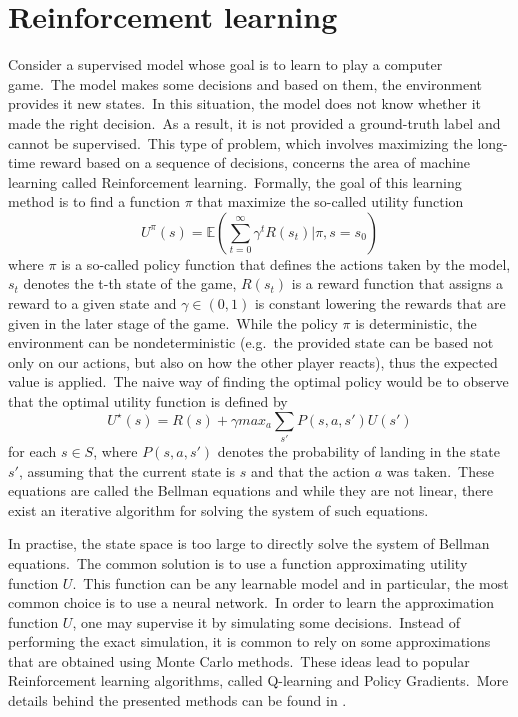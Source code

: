 \documentclass[longabstract, english, mgr]{iithesis}
\theoremstyle{default_theorem_style}\newtheorem{theorem}{Theorem}
\theoremstyle{default_theorem_style}\newtheorem{definition}{Definition}
\begin{document}
\section{Reinforcement learning}\label{sec:reinforcement_learning}

Consider a supervised model whose goal is to learn to play a computer game.\ The model makes some decisions and based
on them, the environment provides it new states.\ In this situation, the model does not know whether it made the
right decision.\ As a result, it is not provided a ground-truth label and cannot be supervised.\ This type of problem,
which involves maximizing the long-time reward based on a sequence of decisions, concerns the area of machine
learning called Reinforcement learning.\ Formally, the goal of this learning method is to find a function $\pi$ that
maximize the so-called utility function
$$
U^{\pi}(s) = \mathbb{E}(\sum_{t=0}^{\infty} \gamma^t R(s_t) | \pi, s = s_0)
$$
where $\pi$ is a so-called policy function that defines the actions taken by the model, $s_t$ denotes the t-th state
of the game, $R(s_t)$ is a reward function that assigns a reward to a given state and $\gamma \in (0, 1)$ is constant
lowering the rewards that are given in the later stage of the game.\ While the policy $\pi$ is deterministic,
the environment can be nondeterministic (e.g.\ the provided state can be based not only on our actions, but also on
how the other player reacts), thus the expected value is applied.\ The naive way of finding the optimal policy would
be to observe that the optimal utility function is defined by
$$
U^{\star}(s) = R(s) + \gamma max_a \sum_{s'} P(s, a, s') U(s')
$$
for each $s \in S$, where $P(s, a, s')$ denotes the probability of landing in the state $s'$, assuming that the
current state is $s$ and that the action $a$ was taken.\ These equations are called the Bellman equations and while
they are not linear, there exist an iterative algorithm for solving the system of such equations.\newline

\noindent In practise, the state space is too large to directly solve the system of Bellman equations.\ The common
solution is to use a function approximating utility function $U$.\ This function can be any learnable model and in
particular, the most common choice is to use a neural network.\ In order to learn the approximation function $U$, one
may supervise it by simulating some decisions.\ Instead of performing the exact simulation, it is common to rely on
some approximations that are obtained using Monte Carlo methods.\ These ideas lead to popular Reinforcement learning
algorithms, called Q-learning and Policy Gradients.\ More details behind the presented methods can be
found in \cite{reinforcement_learning_book}.
\end{document}
